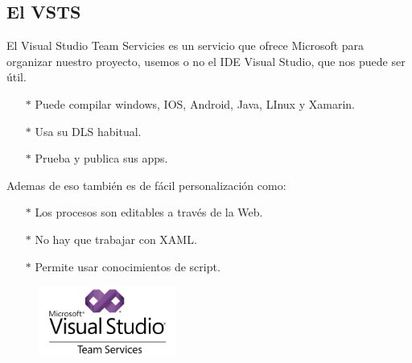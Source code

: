 \documentclass[12pt]{article}
\begin{document}
\subsection{El VSTS}
El Visual Studio Team Servicies es un servicio que ofrece Microsoft para organizar nuestro proyecto, usemos o no el IDE Visual Studio, que nos puede ser útil.
\begin{itemize}
\item[$*$] Puede compilar windows, IOS, Android, Java, LInux y Xamarin.
\item[$*$] Usa su DLS habitual.
\item[$*$] Prueba y publica sus apps.
\end{itemize}

Ademas de eso también es de fácil personalización como:
\begin{itemize}
\item[$*$]Los procesos son editables a través de la Web.
\item[$*$]No hay que trabajar con XAML.
\item[$*$]Permite usar conocimientos de script.
\end{itemize}

\begin{figure}
\begin{center}
  \includegraphics[width=0.4\textwidth]{imagenes/vsts.png}
\end{center}
\end{figure}
\end{document}
